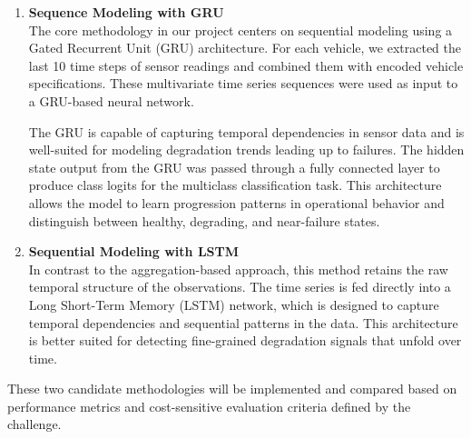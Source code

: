 \documentclass[a4paper,12pt]{article}
\begin{document}
\begin{enumerate}
    \item \textbf{Sequence Modeling with GRU} \\

The core methodology in our project centers on sequential modeling using a Gated Recurrent Unit (GRU) architecture. For each vehicle, we extracted the last 10 time steps of sensor readings and combined them with encoded vehicle specifications. These multivariate time series sequences were used as input to a GRU-based neural network.

The GRU is capable of capturing temporal dependencies in sensor data and is well-suited for modeling degradation trends leading up to failures. The hidden state output from the GRU was passed through a fully connected layer to produce class logits for the multiclass classification task. This architecture allows the model to learn progression patterns in operational behavior and distinguish between healthy, degrading, and near-failure states.


    \item \textbf{Sequential Modeling with LSTM} \\
    In contrast to the aggregation-based approach, this method retains the raw temporal structure of the observations. The time series is fed directly into a Long Short-Term Memory (LSTM) network, which is designed to capture temporal dependencies and sequential patterns in the data. This architecture is better suited for detecting fine-grained degradation signals that unfold over time.
\end{enumerate}

These two candidate methodologies will be implemented and compared based on performance metrics and cost-sensitive evaluation criteria defined by the challenge.
\end{document}
